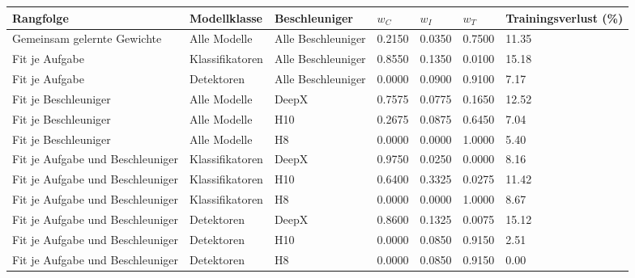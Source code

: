 \begin{tabular}{@{}lllllll@{}}
\toprule
Rangfolge & Modellklasse & Beschleuniger & $w_C$ & $w_I$ & $w_T$ & Trainingsverlust (\%) \\
\midrule
Gemeinsam gelernte Gewichte & Alle Modelle & Alle Beschleuniger & 0.2150 & 0.0350 & 0.7500 & 11.35 \\
Fit je Aufgabe & Klassifikatoren & Alle Beschleuniger & 0.8550 & 0.1350 & 0.0100 & 15.18 \\
Fit je Aufgabe & Detektoren & Alle Beschleuniger & 0.0000 & 0.0900 & 0.9100 & 7.17 \\
Fit je Beschleuniger & Alle Modelle & DeepX & 0.7575 & 0.0775 & 0.1650 & 12.52 \\
Fit je Beschleuniger & Alle Modelle & H10 & 0.2675 & 0.0875 & 0.6450 & 7.04 \\
Fit je Beschleuniger & Alle Modelle & H8 & 0.0000 & 0.0000 & 1.0000 & 5.40 \\
Fit je Aufgabe und Beschleuniger & Klassifikatoren & DeepX & 0.9750 & 0.0250 & 0.0000 & 8.16 \\
Fit je Aufgabe und Beschleuniger & Klassifikatoren & H10 & 0.6400 & 0.3325 & 0.0275 & 11.42 \\
Fit je Aufgabe und Beschleuniger & Klassifikatoren & H8 & 0.0000 & 0.0000 & 1.0000 & 8.67 \\
Fit je Aufgabe und Beschleuniger & Detektoren & DeepX & 0.8600 & 0.1325 & 0.0075 & 15.12 \\
Fit je Aufgabe und Beschleuniger & Detektoren & H10 & 0.0000 & 0.0850 & 0.9150 & 2.51 \\
Fit je Aufgabe und Beschleuniger & Detektoren & H8 & 0.0000 & 0.0850 & 0.9150 & 0.00 \\
\bottomrule
\end{tabular}
